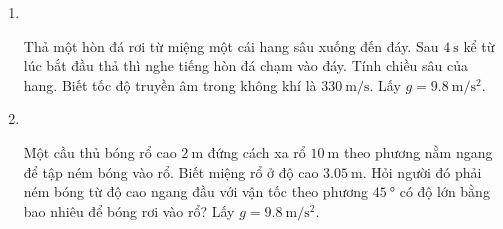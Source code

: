 \begin{enumerate}[label=\bfseries Bài \arabic*:,leftmargin=1.5cm]
{}


\item {}\\
{Thả một hòn đá rơi từ miệng một cái hang sâu xuống đến đáy. Sau $\SI{4}{\second}$ kể từ lúc bắt đầu thả thì nghe tiếng hòn đá chạm vào đáy. Tính chiều sâu của hang. Biết tốc độ truyền âm trong không khí là $\SI{330}{\meter/\second}$. Lấy $g=\SI{9.8}{\meter/\second^2}$.

}

\item {}\\
{Một cầu thủ bóng rổ cao $\SI{2}{\meter}$ đứng cách xa rổ $\SI{10}{\meter}$ theo phương nằm ngang để tập ném bóng vào rổ. Biết miệng rổ ở độ cao $\SI{3.05}{\meter}$. Hỏi người đó phải ném bóng từ độ cao ngang đầu với vận tốc theo phương $\SI{45}{\degree}$ có độ lớn bằng bao nhiêu để bóng rơi vào rổ? Lấy $g=\SI{9.8}{\meter/\second^2}$.

}
\end{enumerate}
